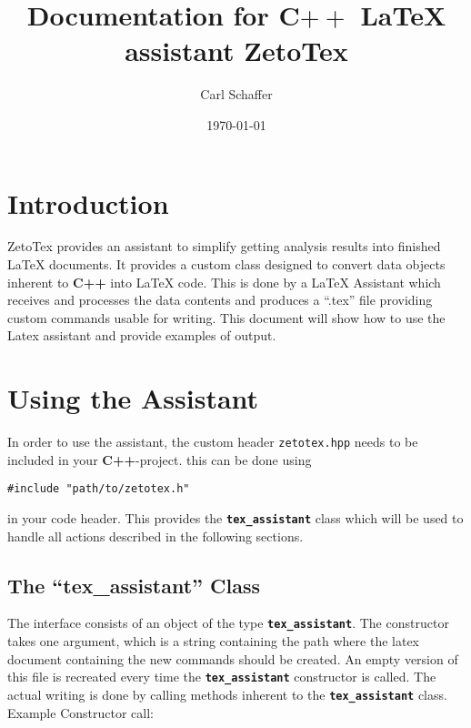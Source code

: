 \documentclass[10pt,a4paper]{article}
\title{Documentation for C${++}$ \LaTeX{} assistant ZetoTex}
\date{\today{}}
\author{Carl Schaffer}
\begin{document}
      \maketitle
      \newpage{}

      \setlength{\parindent}{0pt}

      \newcommand{\stdv}{\texttt{std::vector} } 
      \newcommand{\la}{LaTeX Assistant}
      \newcommand{\ta}{\texttt{\textbf{tex\_assistant}}}
      \newcommand{\filename}[1]{\texttt{#1}}
      \newcommand{\cpp}{\textbf{C++}}
      \newcommand{\ztt}{ZetoTex}

      \newcommand{\singleValCmd}{\cmdstyle{.ncmdValue()}}
      \newcommand{\arrayCmd}{\cmdstyle{.ncmdArray()}}
      \newcommand{\cmdstyle}[1]{\textbf{\texttt{#1}}}

      \newcommand{\headerfile}{\filename{zetotex.hpp}}
      \newcommand{\texfile}{\enquote{.tex} file}


\section{Introduction}
 \ztt{} provides an assistant to simplify
getting analysis results into finished \LaTeX{} documents. It
provides a custom class designed to convert data objects inherent to \cpp{} into
\LaTeX{} code. This is done by a \la{} which receives and processes the data
contents and produces a \enquote{.tex} file providing custom commands usable for
writing. This document will show how to use the Latex assistant and provide
examples of output.


\section{Using the Assistant}
In order to use the assistant, the custom header \headerfile{} needs to be
included in your \cpp{}-project. this can be done using
\begin{verbatim}
#include "path/to/zetotex.h"
\end{verbatim}
in your code header. This provides the \ta{} class which will be used to handle
all actions described in the following sections.
\subsection{The \enquote{tex\_assistant} Class}

The interface consists of an object of the type \ta{}. The constructor takes one
argument, which is a string containing the path where the latex document
containing the new commands should be created. An empty version of this file is
recreated every time the \ta{} constructor is called. The actual writing is done
by calling methods inherent to the \ta{} class. Example Constructor call:
\end{document}
